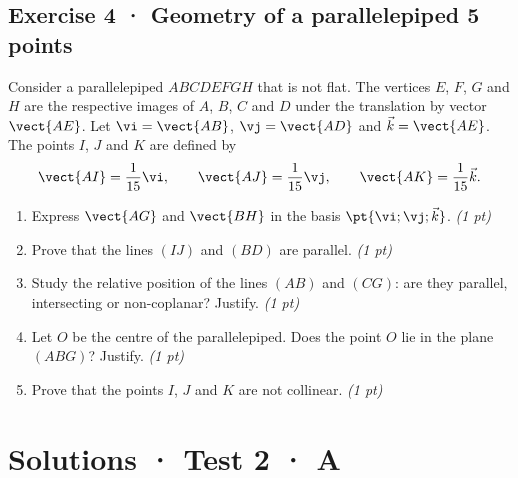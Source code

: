 \subsection*{Exercise 4 · Geometry of a parallelepiped \hfill 5 points}Consider a parallelepiped $ABCDEFGH$ that is not flat. The vertices $E$, $F$, $G$ and $H$ are the respective images of $A$, $B$, $C$ and $D$ under the translation by vector $\vect{AE}$.
Let $\vi=\vect{AB}$, $\vj=\vect{AD}$ and $\vec k=\vect{AE}$.
The points $I$, $J$ and $K$ are defined by
\[\vect{AI}=\frac1{15}\vi,\qquad\vect{AJ}=\frac1{15}\vj,\qquad\vect{AK}=\frac1{15}\vec k.\]

\begin{enumerate}

\item Express $\vect{AG}$ and $\vect{BH}$ in the basis $\pt{\vi;\vj;\vec k}$. \hfill\textit{(1 pt)}

\item Prove that the lines $(IJ)$ and $(BD)$ are parallel. \hfill\textit{(1 pt)}

\item Study the relative position of the lines $(AB)$ and $(CG)$: are they parallel, intersecting or non-coplanar? Justify. \hfill\textit{(1 pt)}

\item Let $O$ be the centre of the parallelepiped. Does the point $O$ lie in the plane $(ABG)$? Justify. \hfill\textit{(1 pt)}

\item Prove that the points $I$, $J$ and $K$ are not collinear. \hfill\textit{(1 pt)}

\end{enumerate}

\ifmxteacher\mxnewpage

\section*{Solutions · Test 2 · A}\label{cor:2-3}

